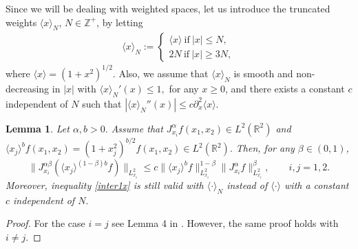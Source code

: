 \documentclass[reqno]{amsart}
\newcommand{\R}{\mathbb R}
\newcommand{\Z}{\mathbb Z}
\numberwithin{equation}{section}
\newtheorem{proposition}[theorem]{Proposition}
\newtheorem{lemma}[theorem]{Lemma}
\begin{document}


Since we will be dealing with weighted spaces, let us introduce the truncated weights $\langle x\rangle_N$, $N\in \Z^{+}$, by letting
\begin{eqnarray*}
\langle x\rangle_N:=\left\{\begin{array} {lccc}
\langle x \rangle \ \mathrm{if} \  |x|\leq N,\\
2N \ \mathrm{if} \ |x|\geq 3N,
\end{array} \right.
\end{eqnarray*}
where $\langle x \rangle = (1+x^2)^{1/2}$. Also, we assume that $\langle x\rangle_N$
is smooth and non-decreasing in $|x|$ with $\langle x\rangle_N'(x)\leq 1,$ for any
$x\geq 0$, and there exists a constant $c$ independent of $N$ such that
$|\langle x\rangle_N''(x)|\leq c \partial_x^{2}\langle x \rangle.$

\begin{lemma}\label{interx}
Let $\alpha,b>0.$ Assume that $J_{x_i}^{\alpha}f(x_1,x_2)\in L^{2}(\R^2)$ and
$\langle x_j \rangle^b f(x_1,x_2)=(1+x_j^2)^{b/2}f(x_1,x_2)\in L^{2}(\R^2).$ Then, for any
$\beta \in (0,1)$,
\begin{equation}\label{inter1x}
\|J_{x_i}^{\alpha \beta}(\langle x_j \rangle^{(1-\beta)b}f)\|_{L^2_{x_i}}\leq c\|\langle  x_j
\rangle^{b}f\|_{L^2_{x_i}}^{1-\beta}\|J_{x_i}^{\alpha}f\|_{L^2_{x_i}}^{\beta}, \qquad i,j=1,2.
\end{equation}
Moreover,  inequality \eqref{inter1x} is  still valid with $\langle \cdot\rangle_N$
instead of $\langle \cdot \rangle$ with a constant $c$ independent of $N.$
\end{lemma}
\begin{proof}
For the case $i=j$ see Lemma 4 in \cite{NahasPonce}. However, the same proof holds with $i\neq j$.
\end{proof}
\end{document}
